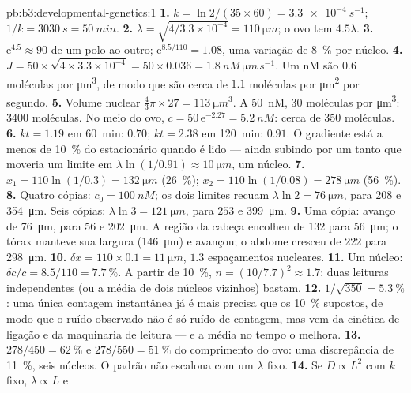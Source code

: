 \begin{solution}{pb:b3:developmental-genetics:1}
\textbf{1.} $k = \ln 2/(35\times 60) = \qty{3.3e-4}{s^{-1}}$; $1/k =
\qty{3030}{s} = \qty{50}{min}$.
\textbf{2.} $\lambda = \sqrt{4/3.3\times 10^{-4}} = \qty{110}{\micro m}$;
o ovo tem $4.5\lambda$.
\textbf{3.} $\mathrm{e}^{4.5} \approx 90$ de um polo ao outro;
$\mathrm{e}^{8.5/110} = 1.08$, uma variação de \qty{8}{\%} por núcleo.
\textbf{4.} $J = 50\times\sqrt{4\times 3.3\times 10^{-4}} = 50\times
0.036 = \qty{1.8}{nM\,\micro m\,s^{-1}}$. Um nM são $0.6$ moléculas
por \unit{\micro m^3}, de modo que são cerca de $1.1$ moléculas por
\unit{\micro m^2} por segundo.
\textbf{5.} Volume nuclear $\tfrac{4}{3}\pi\times 27 = \qty{113}{\micro
m^3}$. A \qty{50}{nM}, $30$ moléculas por \unit{\micro m^3}:
\num{3400} moléculas. No meio do ovo, $c = 50\,\mathrm{e}^{-2.27} =
\qty{5.2}{nM}$: cerca de \num{350} moléculas.
\textbf{6.} $kt = 1.19$ em \qty{60}{min}: $0.70$; $kt = 2.38$ em
\qty{120}{min}: $0.91$. O gradiente está a menos de \qty{10}{\%} do
estacionário quando é lido --- ainda subindo por um tanto que moveria um
limite em $\lambda\ln(1/0.91) \approx \qty{10}{\micro m}$, um núcleo.
\textbf{7.} $x_{1} = 110\ln(1/0.3) = \qty{132}{\micro m}$
(\qty{26}{\%}); $x_{2} = 110\ln(1/0.08) = \qty{278}{\micro m}$
(\qty{56}{\%}).
\textbf{8.} Quatro cópias: $c_{0} = \qty{100}{nM}$; os dois limites
recuam $\lambda\ln 2 = \qty{76}{\micro m}$, para $208$ e
\qty{354}{\micro m}. Seis cópias: $\lambda\ln 3 = \qty{121}{\micro m}$,
para $253$ e \qty{399}{\micro m}.
\textbf{9.} Uma cópia: avanço de \qty{76}{\micro m}, para $56$ e
\qty{202}{\micro m}. A região da cabeça encolheu de $132$ para
\qty{56}{\micro m}; o tórax manteve sua largura (\qty{146}{\micro m}) e
avançou; o abdome cresceu de $222$ para \qty{298}{\micro m}.
\textbf{10.} $\delta x = 110\times 0.1 = \qty{11}{\micro m}$, $1.3$
espaçamentos nucleares.
\textbf{11.} Um núcleo: $\delta c/c = 8.5/110 = \qty{7.7}{\%}$. A partir
de \qty{10}{\%}, $n = (10/7.7)^{2} \approx 1.7$: duas leituras
independentes (ou a média de dois núcleos vizinhos) bastam.
\textbf{12.} $1/\sqrt{350} = \qty{5.3}{\%}$: uma única contagem
instantânea já é mais precisa que os \qty{10}{\%} supostos, de modo que
o ruído observado não é só ruído de contagem, mas vem da cinética de
ligação e da maquinaria de leitura --- e a média no tempo o melhora.
\textbf{13.} $278/450 = \qty{62}{\%}$ e $278/550 = \qty{51}{\%}$ do
comprimento do ovo: uma discrepância de \qty{11}{\%}, seis núcleos. O
padrão não escalona com um $\lambda$ fixo.
\textbf{14.} Se $D \propto L^{2}$ com $k$ fixo, $\lambda \propto L$ e

\end{solution}
